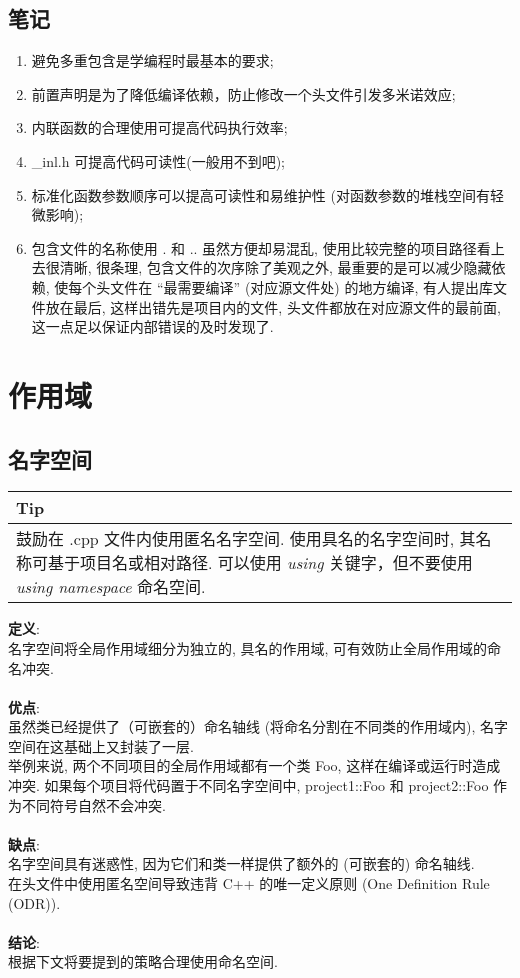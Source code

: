 \documentclass[a4paper,11pt,CJK]{article}
\begin{document}
\begin{CJK}{UTF8}{gbsn}
\subsection{笔记}
\begin{enumerate}
    \item 避免多重包含是学编程时最基本的要求;
    \item 前置声明是为了降低编译依赖，防止修改一个头文件引发多米诺效应;
    \item 内联函数的合理使用可提高代码执行效率;
    \item \_inl.h 可提高代码可读性(一般用不到吧);
    \item 标准化函数参数顺序可以提高可读性和易维护性 (对函数参数的堆栈空间有轻微影响);
    \item 包含文件的名称使用 . 和 .. 虽然方便却易混乱, 使用比较完整的项目路径看上去很清晰, 很条理, 包含文件的次序除了美观之外, 最重要的是可以减少隐藏依赖, 使每个头文件在 ``最需要编译'' (对应源文件处) 的地方编译, 有人提出库文件放在最后, 这样出错先是项目内的文件, 头文件都放在对应源文件的最前面, 这一点足以保证内部错误的及时发现了.
\end{enumerate}
\newpage
\section{作用域}
\subsection{名字空间}
\begin{table}[htbp]
\flushleft
\begin{tabular}{p{400pt}}
\toprule
\rowcolor[gray]{.8} Tip \\
\midrule
鼓励在 .cpp 文件内使用匿名名字空间. 使用具名的名字空间时, 其名称可基于项目名或相对路径. 可以使用 \emph{using} 关键字，但不要使用\emph{using namespace} 命名空间.\\
\bottomrule
\end{tabular}
\end{table}
\noindent
\textbf{定义}: \\
\indent 名字空间将全局作用域细分为独立的, 具名的作用域, 可有效防止全局作用域的命名冲突. \\
\\
\textbf{优点}: \\
\indent 虽然类已经提供了（可嵌套的）命名轴线 (将命名分割在不同类的作用域内), 名字空间在这基础上又封装了一层. \\
\indent 举例来说, 两个不同项目的全局作用域都有一个类 Foo, 这样在编译或运行时造成冲突. 如果每个项目将代码置于不同名字空间中, project1::Foo 和 project2::Foo 作为不同符号自然不会冲突. \\
\\
\textbf{缺点}: \\
\indent 名字空间具有迷惑性, 因为它们和类一样提供了额外的 (可嵌套的) 命名轴线. \\
\indent 在头文件中使用匿名空间导致违背 C++ 的唯一定义原则 (One Definition Rule (ODR)). \\
\\
\textbf{结论}: \\
\indent 根据下文将要提到的策略合理使用命名空间. \\

\end{CJK}
\end{document}
